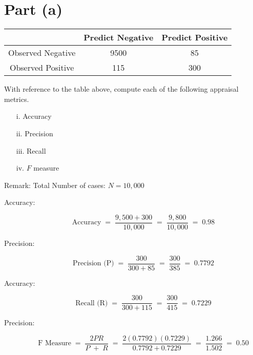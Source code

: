 \documentclass[a4paper,12pt]{article}
\begin{document}
	
\newpage 

	\section*{Part (a)}	

	\begin{center}
		\begin{tabular}{|c|c|c|}
			\hline  & \phantom{spa}Predict Negative\phantom{spa} & \phantom{spa}Predict Positive\phantom{spa} \\ 
			\hline Observed Negative &	9500	&	85	\\ 
			\hline Observed Positive & 	115	&	300	\\ 
			\hline 
		\end{tabular} 
	\end{center}
\medskip 
\begin{framed}
\noindent With reference to the table above, compute each of the following appraisal metrics.
\begin{multicols}{2} 
	\begin{itemize}
		\item [i.] Accuracy
		\item [ii.] Precision
		\item [iii.] Recall
		\item [iv.] $F$ measure
	\end{itemize}
\end{multicols}
\end{framed}
\medskip 


\noindent Remark: Total Number of cases: $N=10,000$
\begin{description}
\item[Accuracy:]

\[ \mbox{Accuracy} \;=\;\frac{9,500 + 300}{10,000}  \;=\;\frac{9,800}{10,000} \;=\;0.98 \] 
\item[Precision:]

\[ \mbox{Precision (P)} \;=\;\frac{300}{300+85}  \;=\;\frac{300}{385} \;=\;0.7792 \] 
\item[Accuracy:]

\[ \mbox{Recall (R)} \;=\;\frac{300}{300+115}  \;=\;\frac{300}{415} \;=\;0.7229 \] 
\item[Precision:]

\[ \mbox{F Measure} \;=\;\frac{2PR}{P\;+\;R}  \;=\;\frac{2(0.7792)(0.7229)}{ 0.7792 + 0.7229} \;=\;\frac{1.266}{1.502} \;=\;0.50 \] 

\end{description}
\newpage 
\end{document}
